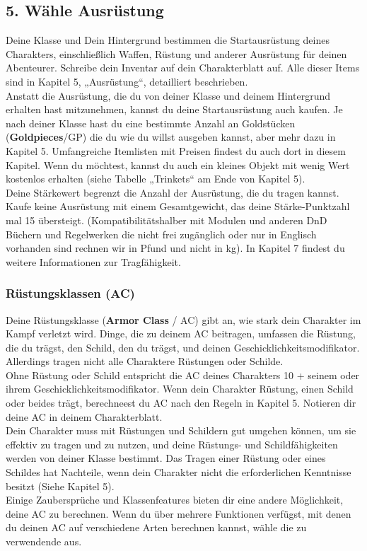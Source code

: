 \subsection{5. Wähle Ausrüstung}
Deine Klasse und Dein Hintergrund bestimmen die Startausrüstung deines Charakters, einschließlich Waffen, Rüstung und anderer Ausrüstung für deinen Abenteurer. Schreibe dein Inventar auf dein Charakterblatt auf. Alle dieser Items sind in Kapitel 5, „Ausrüstung“, detailliert beschrieben.\\
Anstatt die Ausrüstung, die du von deiner Klasse und deinem Hintergrund erhalten hast mitzunehmen, kannst du deine Startausrüstung auch kaufen. Je nach deiner Klasse hast du eine bestimmte Anzahl an Goldstücken (\textbf{Goldpieces}/GP) die du wie du willst ausgeben kannst, aber mehr dazu in Kapitel 5. Umfangreiche Itemlisten mit Preisen findest du auch dort in diesem Kapitel. Wenn du möchtest, kannst du auch ein kleines Objekt mit wenig Wert kostenlos erhalten (siehe Tabelle „Trinkets“ am Ende von Kapitel 5).\\
Deine Stärkewert begrenzt die Anzahl der Ausrüstung, die du tragen kannst. Kaufe keine Ausrüstung mit einem Gesamtgewicht, das deine Stärke-Punktzahl mal 15 übersteigt. (Kompatibilitätshalber mit Modulen und anderen DnD Büchern und Regelwerken die nicht frei zugänglich oder nur in Englisch vorhanden sind rechnen wir in Pfund und nicht in kg). In Kapitel 7 findest du weitere Informationen zur Tragfähigkeit.

\subsubsection{Rüstungsklassen (AC)}
Deine Rüstungsklasse (\textbf{Armor Class} / AC) gibt an, wie stark dein Charakter im Kampf verletzt wird. Dinge, die zu deinem AC beitragen, umfassen die Rüstung, die du trägst, den Schild, den du trägst, und deinen Geschicklichkeitsmodifikator. Allerdings tragen nicht alle Charaktere Rüstungen oder Schilde.\\
Ohne Rüstung oder Schild entspricht die AC deines Charakters 10 + seinem oder ihrem Geschicklichkeitsmodifikator. Wenn dein Charakter Rüstung, einen Schild oder beides trägt, berechneest du AC nach den Regeln in Kapitel 5. Notieren dir deine AC in deinem Charakterblatt.\\
Dein Charakter muss mit Rüstungen und Schildern gut umgehen können, um sie effektiv zu tragen und zu nutzen, und deine Rüstungs- und Schildfähigkeiten werden von deiner Klasse bestimmt. Das Tragen einer Rüstung oder eines Schildes hat Nachteile, wenn dein Charakter nicht die erforderlichen Kenntnisse besitzt (Siehe Kapitel 5).\\
Einige Zaubersprüche und Klassenfeatures bieten dir eine andere Möglichkeit, deine AC zu berechnen. Wenn du über mehrere Funktionen verfügst, mit denen du deinen AC auf verschiedene Arten berechnen kannst, wähle die zu verwendende aus.\\

